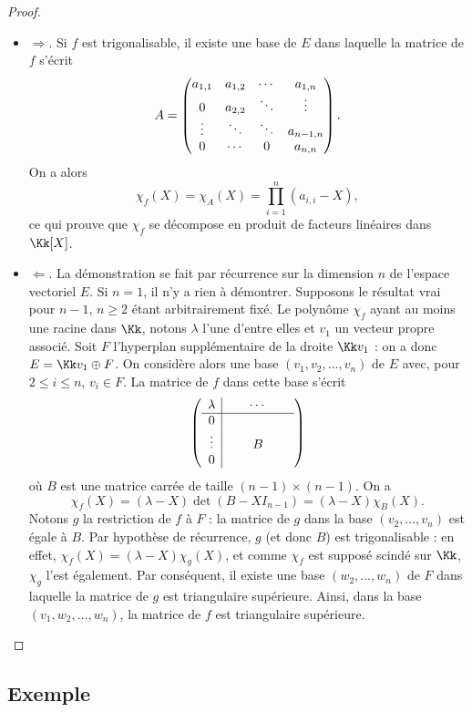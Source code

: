 \documentclass[12pt, class=report,crop=false]{standalone}
\begin{document}
\begin{proof}~
\begin{itemize}

\item $\Longrightarrow$. 
Si $f$ est trigonalisable, il existe une base de $E$ dans laquelle la matrice de $f$ s'écrit
$$A=\begin{pmatrix}a_{1,1}&a_{1,2}&\cdots &a_{1,n} \cr 0&a_{2,2} &\ddots &\vdots \cr\vdots &\ddots &\ddots& a_{n-1,n}\cr0&\cdots&0&a_{n,n}\end{pmatrix}.$$
On a alors
$$\chi_f(X)=\chi_A(X)=\prod_{i=1}^n(a_{i,i}-X),$$
ce qui prouve que $\chi_f$ se décompose en produit de facteurs linéaires dans $\Kk[X]$.

\item $\Longleftarrow$.
La démonstration se fait par récurrence sur la dimension $n$ de l'espace vectoriel $E$. 
Si $n=1$, il n'y a rien à démontrer. Supposons le résultat vrai pour $n-1$, $n\ge2$ étant arbitrairement fixé. Le polynôme $\chi_f$ ayant au moins une racine dans $\Kk$, 
notons $\lambda$ l'une d'entre elles et $v_1$ un vecteur propre associé. 
Soit $F$ l'hyperplan supplémentaire de la droite $\Kk v_1$ : on a donc $E = \Kk v_1 \oplus F$. 
On considère alors une base $(v_1,v_2,\ldots,v_n)$ de $E$ avec, pour $2 \le i \le n$, 
$v_i\in F$. La matrice de $f$ dans cette base s'écrit
$$\left(\begin{array}{c|ccc}
\lambda &\ \  &\cdots&\ \  \cr \hline
0 &\ &\ & \cr
\vdots& & B &\cr
0&\ &\ &\  
\end{array}\right)$$
où $B$ est une matrice carrée de taille $(n-1)\times(n-1)$. On a 
$$\chi_f(X)=(\lambda-X)\det(B-X I_{n-1})=(\lambda-X)\chi_B(X).$$
Notons $g$ la restriction de $f$ à $F$ : la matrice de $g$ dans la base $(v_2,\ldots,v_n)$ est égale à $B$. Par hypothèse de récurrence, $g$ (et donc $B$) est trigonalisable : en effet, $\chi_f(X)=(\lambda-X)\chi_g(X)$,
 et comme $\chi_f$ est supposé scindé sur $\Kk$, $\chi_g$ l'est également. 
 Par conséquent, il existe une base $(w_2,\ldots,w_n)$ de $F$ dans laquelle la matrice de $g$ est triangulaire supérieure. Ainsi, dans la base $(v_1,w_2,\ldots,w_n)$, la matrice de $f$ est triangulaire supérieure.
\end{itemize}
\end{proof} 



\subsection{Exemple}
\end{document}
